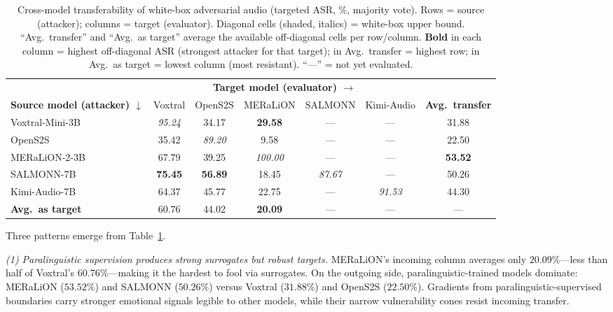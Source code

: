 \begin{table}[!t]
\centering
\small
\caption{Cross-model transferability of white-box adversarial audio (targeted ASR, \%, majority vote).
Rows = source (attacker); columns = target (evaluator).
Diagonal cells (shaded, italics) = white-box upper bound.
``Avg.\ transfer'' and ``Avg.\ as target'' average the available off-diagonal cells per row/column.
\textbf{Bold} in each column = highest off-diagonal ASR (strongest attacker for that target); in Avg.\ transfer = highest row; in Avg.\ as target = lowest column (most resistant).
``---'' = not yet evaluated.}
\label{tab:cross_model_transfer}
\setlength{\tabcolsep}{6pt}
\begin{tabular}{l ccccc c}
\toprule
 & \multicolumn{5}{c}{\textbf{Target model (evaluator) $\rightarrow$}} & \\
\cmidrule(lr){2-6}
\textbf{Source model (attacker) $\downarrow$}
 & Voxtral & OpenS2S & MERaLiON & SALMONN & Kimi-Audio & \textbf{Avg.\ transfer} \\
\midrule
Voxtral-Mini-3B  & \cellcolor{gray!15}\textit{95.24} & 34.17 & \textbf{29.58} & --- & --- & 31.88 \\
OpenS2S          & 35.42 & \cellcolor{gray!15}\textit{89.20} & 9.58  & --- & --- & 22.50 \\
MERaLiON-2-3B    & 67.79 & 39.25 & \cellcolor{gray!15}\textit{100.00} & --- & --- & \textbf{53.52} \\
SALMONN-7B       & \textbf{75.45} & \textbf{56.89} & 18.45 & \cellcolor{gray!15}\textit{87.67} & --- & 50.26 \\
Kimi-Audio-7B    & 64.37 & 45.77 & 22.75 & --- & \cellcolor{gray!15}\textit{91.53} & 44.30 \\
\midrule
\textbf{Avg.\ as target} & 60.76 & 44.02 & \textbf{20.09} & --- & --- & --- \\
\bottomrule
\end{tabular}
\end{table}

Three patterns emerge from Table~\ref{tab:cross_model_transfer}.

\textit{(1) Paralinguistic supervision produces strong surrogates but robust targets.}
MERaLiON's incoming column averages only $20.09\%$---less than half of Voxtral's $60.76\%$---making it the hardest to fool via surrogates.
On the outgoing side, paralinguistic-trained models dominate: MERaLiON ($53.52\%$) and SALMONN ($50.26\%$) versus Voxtral ($31.88\%$) and OpenS2S ($22.50\%$).
Gradients from paralinguistic-supervised boundaries carry stronger emotional signals legible to other models, while their narrow vulnerability cones resist incoming transfer.

